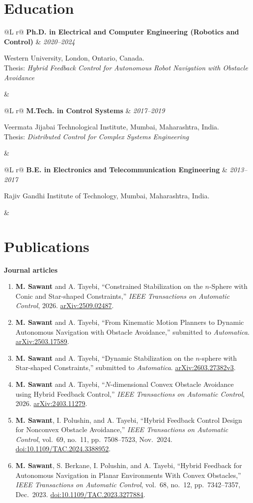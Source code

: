 \documentclass[10pt]{article}
\makeatletter
\newcommand{\CVSection}[1]{\section*{#1}\vspace{-2pt}}
\newcommand{\Entry}[3]{%
  \begin{tabularx}{\textwidth}{@{}L r@{}}
    \textbf{#1} & \textit{\mbox{#3}}\\[-2pt]
    \parbox[t]{\linewidth}{\setlength{\parskip}{0pt}#2} &
  \end{tabularx}\par
}
\newcommand{\DOI}[1]{\href{https://doi.org/#1}{doi:#1}}
\makeatother
\begin{document}
\CVSection{Education}
\Entry{Ph.D. in Electrical and Computer Engineering (Robotics and Control)}{Western University, London, Ontario, Canada.\\[-1pt]
{\small Thesis: \textit{Hybrid Feedback Control for Autonomous Robot Navigation with Obstacle Avoidance}}}{2020--2024}
\vspace{4pt}
\Entry{M.Tech. in Control Systems}{Veermata Jijabai Technological Institute, Mumbai, Maharashtra, India.\\[-1pt]
{\small Thesis: \textit{Distributed Control for Complex Systems Engineering}}}{2017--2019}
\vspace{4pt}
\Entry{B.E. in Electronics and Telecommunication Engineering}{Rajiv Gandhi Institute of Technology, Mumbai, Maharashtra, India.}{2013--2017}

\CVSection{Publications}

\textbf{Journal articles}
\begin{enumerate}
  \item \textbf{M. Sawant} and A. Tayebi, ``Constrained Stabilization on the $n$-Sphere with Conic and Star-shaped Constraints,'' \textit{IEEE Transactions on Automatic Control}, 2026. \href{https://arxiv.org/abs/2509.02487}{arXiv:2509.02487}.
  \item \textbf{M. Sawant} and A. Tayebi, ``From Kinematic Motion Planners to Dynamic Autonomous Navigation with Obstacle Avoidance,'' submitted to \textit{Automatica}. \href{https://arxiv.org/abs/2503.17589}{arXiv:2503.17589}. \item \textbf{M. Sawant} and A. Tayebi, ``Dynamic Stabilization on the $n$-sphere with Star-shaped Constraints,'' submitted to \textit{Automatica}. \href{https://arxiv.org/abs/2603.27382v3}{arXiv:2603.27382v3}.
  \item \textbf{M. Sawant} and A. Tayebi, ``$N$-dimensional Convex Obstacle Avoidance using Hybrid Feedback Control,'' \textit{IEEE Transactions on Automatic Control}, 2026. \href{https://arxiv.org/abs/2403.11279}{arXiv:2403.11279}.
  \item \textbf{M. Sawant}, I. Polushin, and A. Tayebi, ``Hybrid Feedback Control Design for Nonconvex Obstacle Avoidance,'' \textit{IEEE Transactions on Automatic Control}, vol.~69, no.~11, pp.~7508--7523, Nov.~2024. \DOI{10.1109/TAC.2024.3388952}.
  \item \textbf{M. Sawant}, S. Berkane, I. Polushin, and A. Tayebi, ``Hybrid Feedback for Autonomous Navigation in Planar Environments With Convex Obstacles,'' \textit{IEEE Transactions on Automatic Control}, vol.~68, no.~12, pp.~7342--7357, Dec.~2023. \DOI{10.1109/TAC.2023.3277884}.
\end{enumerate}
\end{document}
